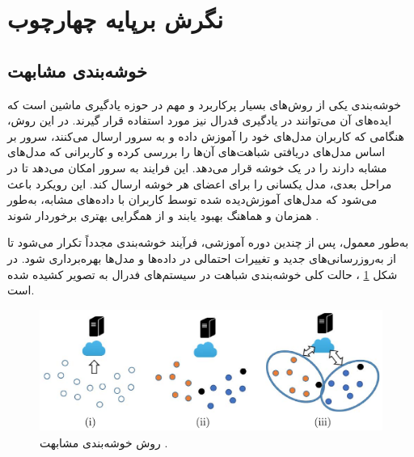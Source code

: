 \section{نگرش برپایه چهارچوب}

\subsection{
	خوشه‌بندی مشابهت%
}
خوشه‌بندی یکی از روش‌های بسیار پرکاربرد و مهم در حوزه یادگیری ماشین است که ایده‌های آن می‌توانند در یادگیری فدرال نیز مورد استفاده قرار گیرند. در این روش، هنگامی که کاربران مدل‌های خود را آموزش داده و به سرور ارسال می‌کنند، سرور بر اساس مدل‌های دریافتی شباهت‌های آن‌ها را بررسی کرده و کاربرانی که مدل‌های مشابه دارند را در یک خوشه قرار می‌دهد. این فرایند به سرور امکان می‌دهد تا در مراحل بعدی، مدل یکسانی را برای اعضای هر خوشه ارسال کند. این رویکرد باعث می‌شود که مدل‌های آموزش‌دیده شده توسط کاربران با داده‌های مشابه، به‌طور همزمان و هماهنگ بهبود یابند و از همگرایی بهتری برخوردار شوند
\cite{ghosh2019robust}.

به‌طور معمول، پس از چندین دوره آموزشی، فرآیند خوشه‌بندی مجدداً تکرار می‌شود تا از به‌روزرسانی‌های جدید و تغییرات احتمالی در داده‌ها و مدل‌ها بهره‌برداری شود. در شکل
\ref{similarity_clustering}%
، حالت کلی خوشه‌بندی شباهت در سیستم‌های فدرال به تصویر کشیده شده است.


\begin{figure}[b]
	\centering
	\includegraphics[scale=0.9]{images/chap3/similarity_clustering.png}%
	\caption{%
		روش خوشه‌بندی مشابهت 
		\cite{ghosh2019robust}%
		.
	}
	\label{similarity_clustering}
	\centering
\end{figure}




